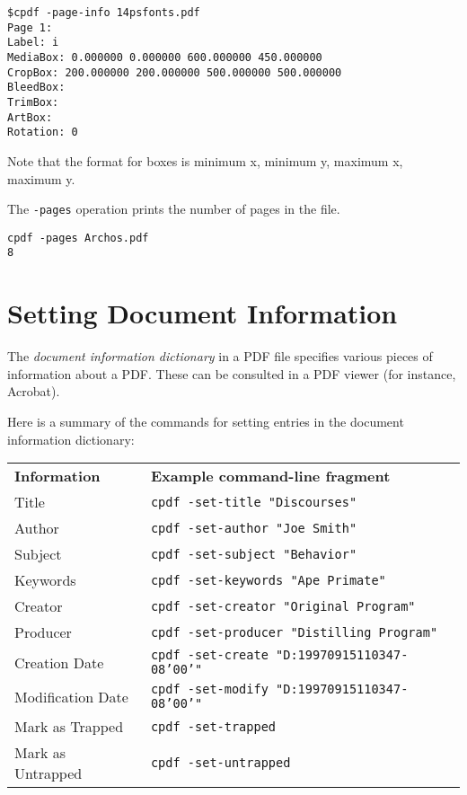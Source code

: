 \documentclass{book}
\newcommand{\smallgap}{\bigskip}
\begin{document}
\begin{framed}
{\small\begin{verbatim}
$cpdf -page-info 14psfonts.pdf
Page 1:
Label: i
MediaBox: 0.000000 0.000000 600.000000 450.000000
CropBox: 200.000000 200.000000 500.000000 500.000000
BleedBox: 
TrimBox: 
ArtBox:
Rotation: 0
\end{verbatim}}
\end{framed}

\noindent Note that the format for boxes is minimum x, minimum y, maximum x, maximum y.

\smallgap 
\noindent The \texttt{-pages} operation prints the number of pages in the file.
\begin{framed}
{\small\begin{verbatim}
cpdf -pages Archos.pdf
8
\end{verbatim}}
\end{framed}

\section{Setting Document Information}
\label{setdocinfo}
  The \textit{document information dictionary} in a PDF file specifies various
pieces of information about a PDF. These can be consulted in a PDF viewer (for
instance, Acrobat).

  Here is a summary of the commands for setting entries in the document
information dictionary:

{\small\begin{framed}
    \noindent\begin{tabular}{ll}
       \textbf{Information} & \textbf{Example command-line fragment} \\
       Title & \texttt{cpdf -set-title "Discourses"} \\
       Author & \texttt{cpdf -set-author "Joe Smith"} \\
       Subject & \texttt{cpdf -set-subject "Behavior"} \\
       Keywords & \texttt{cpdf -set-keywords "Ape Primate"} \\
       Creator & \texttt{cpdf -set-creator "Original Program"} \\
       Producer & \texttt{cpdf -set-producer "Distilling Program"} \\
       Creation Date & \texttt{cpdf -set-create "D:19970915110347-08'00'"} \\
       Modification Date & \texttt{cpdf -set-modify "D:19970915110347-08'00'"} \\
       Mark as Trapped & \texttt{cpdf -set-trapped} \\
       Mark as Untrapped & \texttt{cpdf -set-untrapped} \\
    \end{tabular}
\end{framed}}
\end{document}
